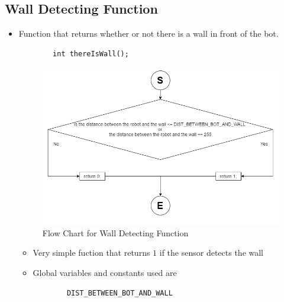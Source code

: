 \documentclass[11pt]{article}
\begin{document}
\newpage


\subsection{Wall Detecting Function}
\begin{itemize}
\item Function that returns whether or not there is a wall in front of the bot.
	\begin{verbatim}
		int thereIsWall();
	\end{verbatim}
\begin{figure}[htp]
\centering
\includegraphics[scale=0.60]{images/Software_Flowchart/Detecting_Wall.png}
\caption{Flow Chart for Wall Detecting Function}
\label{}
\end{figure}
	\begin{itemize}
	\item Very simple fuction that returns $1$ if the sensor detects the wall
	\item Global variables and constants used are
	\begin{verbatim}
		DIST_BETWEEN_BOT_AND_WALL
	\end{verbatim}
	\end{itemize}
\end{itemize}
\newpage

\end{document}
